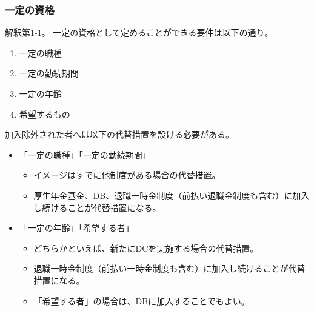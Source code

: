 \newpage

\subsubsection{一定の資格}

\begin{itembox}[l]{}
  解釈第1-1。
  一定の資格として定めることができる要件は以下の通り。
  \begin{enumerate}
    \item 一定の職種
    \item 一定の勤続期間
    \item 一定の年齢
    \item 希望するもの
  \end{enumerate}
  加入除外された者へは以下の代替措置を設ける必要がある。
  \begin{itemize}
    \item 「一定の職種」「一定の勤続期間」
    \begin{itemize}
      \item イメージはすでに他制度がある場合の代替措置。
      \item 厚生年金基金、DB、退職一時金制度（前払い退職金制度も含む）に加入し続けることが代替措置になる。
    \end{itemize}
    \item 「一定の年齢」「希望する者」
    \begin{itemize}
      \item どちらかといえば、新たにDCを実施する場合の代替措置。
      \item 退職一時金制度（前払い一時金制度も含む）に加入し続けることが代替措置になる。
      \item 「希望する者」の場合は、DBに加入することでもよい。
    \end{itemize}
  \end{itemize}
\end{itembox}

